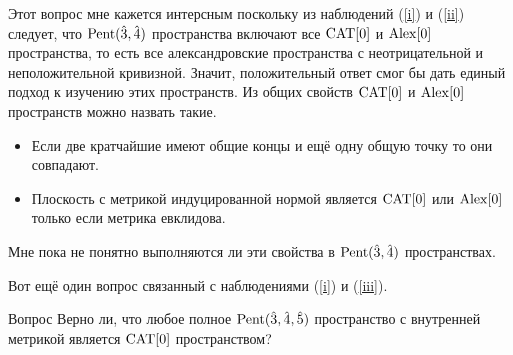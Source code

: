 \documentclass{article}
\begin{document}
Этот вопрос мне кажется интерсным поскольку из наблюдений (\ref{i}) и (\ref{ii}) 
следует, что $\text{\rm Pent}(\hat 3,\hat 4)$ пространства
включают все $\mathrm{CAT}[0]$ и $\mathrm{Alex}[0]$ пространства, то есть все александровские пространства с неотрицательной и неположительной кривизной.
Значит, положительный ответ 
смог бы дать единый подход к изучению этих пространств.
Из общих свойств $\mathrm{CAT}[0]$ и $\mathrm{Alex}[0]$ пространств можно назвать такие.
\begin{itemize}
\item Если две кратчайшие имеют общие концы и ещё одну общую точку то они совпадают.
\item Плоскость с метрикой индуцированной нормой является $\mathrm{CAT}[0]$ или $\mathrm{Alex}[0]$ только если метрика евклидова.
\end{itemize}
Мне пока не понятно выполняются ли эти свойства в $\text{\rm Pent}(\hat 3,\hat 4)$ пространствах.

Вот ещё один вопрос связанный с наблюдениями (\ref{i}) и (\ref{iii}).

\begin{thm}{Вопрос}
Верно ли, что любое полное $\text{\rm Pent}(\hat 3,\hat 4,\hat 5)$ пространство с внутренней метрикой является $\mathrm{CAT}[0]$ пространством?
\end{thm} 
\end{document}
